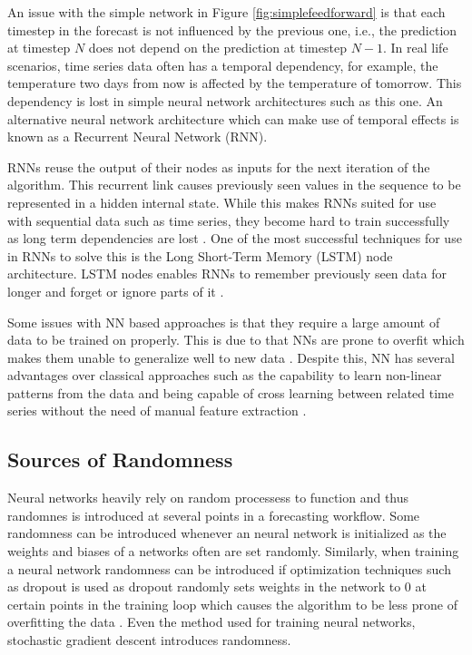 An issue with the simple network in Figure \ref{fig:simplefeedforward} is that each timestep in the forecast is not influenced by the previous one, i.e., the prediction at timestep \(N\) does not depend on the prediction at timestep \(N-1\). In real life scenarios, time series data often has a temporal dependency, for example, the temperature two days from now is affected by the temperature of tomorrow. This dependency is lost in simple neural network architectures such as this one. An alternative neural network architecture which can make use of temporal effects is known as a Recurrent Neural Network (RNN).

RNNs reuse the output of their nodes as inputs for the next iteration of the algorithm. This recurrent link causes previously seen values in the sequence to be represented in a hidden internal state. While this makes RNNs suited for use with sequential data such as time series, they become hard to train successfully as long term dependencies are lost \cite{bengio1994learning}. One of the most successful techniques for use in RNNs to solve this is the Long Short-Term Memory (LSTM) node architecture. LSTM nodes enables RNNs to remember previously seen data for longer and forget or ignore parts of it \cite{sherstinsky_fundamentals_2020}.

Some issues with NN based approaches is that they require a large amount of data to be trained on properly. This is due to that NNs are prone to overfit which makes them unable to generalize well to new data \cite{srivastava_dropout_2014}. Despite this, NN has several advantages over classical approaches such as the capability to learn non-linear patterns from the data and being capable of cross learning between related time series without the need of manual feature extraction \cite{smyl_hybrid_2020}.

\subsection{Sources of Randomness}
\label{subsec:sources_randomness}
Neural networks heavily rely on random processess to function and thus randomnes is introduced at several points in a forecasting workflow. Some randomness can be introduced whenever an neural network is initialized as the weights and biases of a networks often are set randomly. Similarly, when training a neural network randomness can be introduced if optimization techniques such as dropout is used as dropout randomly sets weights in the network to 0 at certain points in the training loop which causes the algorithm to be less prone of overfitting the data \cite{srivastava_dropout_2014}. Even the method used for training neural networks, stochastic gradient descent introduces randomness.

